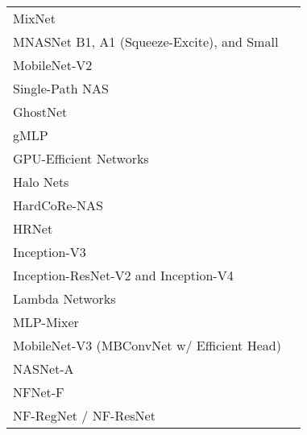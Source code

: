 \begin{table}[]
\begin{tabular}{ll}
    MixNet                                                                   & \cite{tan_mixconv_2019}                  \\
    MNASNet B1, A1 (Squeeze-Excite), and Small                               & \cite{tan_mnasnet_2019}                  \\
    MobileNet-V2                                                             & \cite{sandler_mobilenetv2_2019}          \\
    Single-Path NAS                                                          & \cite{stamoulis_single-path_2019}        \\
    GhostNet                                                                 & \cite{han_ghostnet_2020}                 \\
    gMLP                                                                     & \cite{liu_pay_2021}                      \\
    GPU-Efficient Networks                                                   & \cite{lin_neural_2020}                   \\
    Halo Nets                                                                & \cite{vaswani_scaling_2021}              \\
    HardCoRe-NAS                                                             & \cite{nayman_hardcore-nas_2021}          \\
    HRNet                                                                    & \cite{wang_deep_2020}                    \\
    Inception-V3                                                             & \cite{szegedy_rethinking_2015}           \\
    Inception-ResNet-V2 and Inception-V4                                     & \cite{szegedy_inception-v4_2016}         \\
    Lambda Networks                                                          & \cite{bello_lambdanetworks_2021}         \\
    MLP-Mixer                                                                & \cite{tolstikhin_mlp-mixer_2021}         \\
    MobileNet-V3 (MBConvNet w/ Efficient Head)                               & \cite{howard_searching_2019}             \\
    NASNet-A                                                                 & \cite{zoph_learning_2018}                \\
    NFNet-F                                                                  & \cite{brock_high-performance_2021}       \\
    NF-RegNet / NF-ResNet                                                    & \cite{brock_characterizing_2021}         \\
    \end{tabular}
    \end{table}
